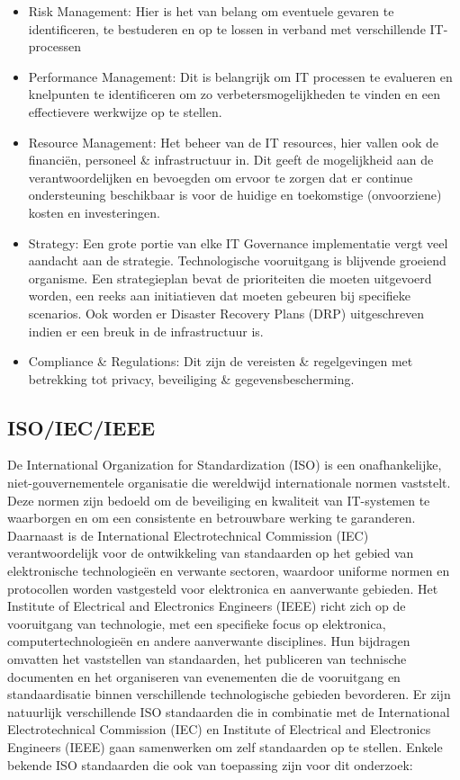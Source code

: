 \begin{itemize}
  \item Risk Management:
  Hier is het van belang om eventuele gevaren te identificeren, te bestuderen en op te lossen in verband met verschillende IT-processen
  \item Performance Management:
  Dit is belangrijk om IT processen te evalueren en knelpunten te identificeren om zo verbetersmogelijkheden te vinden en een effectievere werkwijze op te stellen.
  \item Resource Management:
  Het beheer van de IT resources, hier vallen ook de financiën, personeel \& infrastructuur in. Dit geeft de mogelijkheid aan de verantwoordelijken en bevoegden om ervoor te zorgen dat er continue ondersteuning beschikbaar is voor de huidige en toekomstige (onvoorziene) kosten en investeringen.
  \item Strategy:
  Een grote portie van elke IT Governance implementatie vergt veel aandacht aan de strategie. Technologische vooruitgang is blijvende groeiend organisme. Een strategieplan bevat de prioriteiten die moeten uitgevoerd worden, een reeks aan initiatieven dat moeten gebeuren bij specifieke scenarios. Ook worden er Disaster Recovery Plans (DRP) uitgeschreven indien er een breuk in de infrastructuur is.
  \item Compliance \& Regulations:
  Dit zijn de vereisten \& regelgevingen met betrekking tot privacy, beveiliging \& gegevensbescherming.
\end{itemize}

\subsection{ISO/IEC/IEEE}
De International Organization for Standardization (ISO) is een onafhankelijke, niet-gouvernementele organisatie die wereldwijd internationale normen vaststelt. Deze normen zijn bedoeld om de beveiliging en kwaliteit van IT-systemen te waarborgen en om een consistente en betrouwbare werking te garanderen.
Daarnaast is de International Electrotechnical Commission (IEC) verantwoordelijk voor de ontwikkeling van standaarden op het gebied van elektronische technologieën en verwante sectoren, waardoor uniforme normen en protocollen worden vastgesteld voor elektronica en aanverwante gebieden.
Het Institute of Electrical and Electronics Engineers (IEEE) richt zich op de vooruitgang van technologie, met een specifieke focus op elektronica, computertechnologieën en andere aanverwante disciplines. Hun bijdragen omvatten het vaststellen van standaarden, het publiceren van technische documenten en het organiseren van evenementen die de vooruitgang en standaardisatie binnen verschillende technologische gebieden bevorderen.
Er zijn natuurlijk verschillende ISO standaarden die in combinatie met de International Electrotechnical Commission (IEC) en Institute of Electrical and Electronics Engineers (IEEE) gaan samenwerken om zelf standaarden op te stellen. Enkele bekende ISO standaarden die ook van toepassing zijn voor dit onderzoek:

